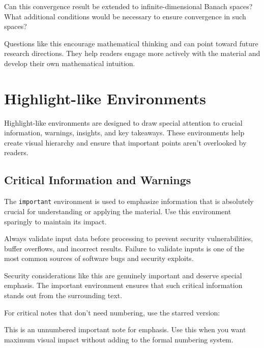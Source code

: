 \documentclass[9pt]{amsart}
\begin{document}
\begin{question}
    Can this convergence result be extended to infinite-dimensional Banach spaces? What additional conditions would be necessary to ensure convergence in such spaces?
\end{question}

Questions like this encourage mathematical thinking and can point toward future
research directions. They help readers engage more actively with the material
and develop their own mathematical intuition.

\section{Highlight-like Environments}

Highlight-like environments are designed to draw special attention to crucial
information, warnings, insights, and key takeaways. These environments help
create visual hierarchy and ensure that important points aren't overlooked by
readers.

\subsection{Critical Information and Warnings}

The \texttt{important} environment is used to emphasize information that is
absolutely crucial for understanding or applying the material. Use this
environment sparingly to maintain its impact.

\begin{important}
    Always validate input data before processing to prevent security vulnerabilities, buffer overflows, and incorrect results. Failure to validate inputs is one of the most common sources of software bugs and security exploits.
\end{important}

Security considerations like this are genuinely important and deserve special
emphasis. The important environment ensures that such critical information
stands out from the surrounding text.

For critical notes that don't need numbering, use the starred version:

\begin{important*}
    This is an unnumbered important note for emphasis. Use this when you want maximum visual impact without adding to the formal numbering system.
\end{important*}
\end{document}

